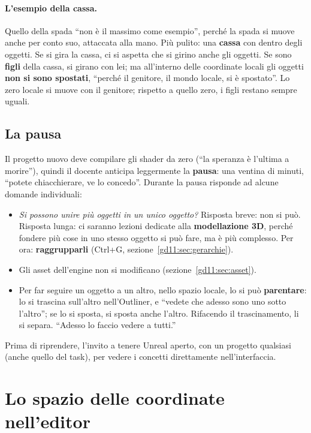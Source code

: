 \paragraph{L'esempio della cassa.} Quello della spada ``non è il massimo come
esempio'', perché la spada si muove anche per conto suo, attaccata alla mano. Più
pulito: una \textbf{cassa} con dentro degli oggetti. Se si gira la cassa, ci si
aspetta che si girino anche gli oggetti. Se sono \textbf{figli} della cassa,
si girano con lei; ma all'interno delle coordinate locali gli oggetti \textbf{non
si sono spostati}, ``perché il genitore, il mondo locale, si è spostato''. Lo
zero locale si muove con il genitore; rispetto a quello zero, i figli restano
sempre uguali.

\subsection{La pausa}

Il progetto nuovo deve compilare gli shader da zero (``la speranza è l'ultima a
morire''), quindi il docente anticipa leggermente la \textbf{pausa}: una ventina
di minuti, ``potete chiacchierare, ve lo concedo''. Durante la pausa risponde ad
alcune domande individuali:
\begin{itemize}
  \item \emph{Si possono unire più oggetti in un unico oggetto?} Risposta
        breve: non si può. Risposta lunga: ci saranno lezioni dedicate alla
        \textbf{modellazione 3D}, perché fondere più cose in uno stesso oggetto
        si può fare, ma è più complesso. Per ora: \textbf{raggrupparli}
        (Ctrl+G, sezione~\ref{gd11:sec:gerarchie}).
  \item Gli asset dell'engine non si modificano (sezione~\ref{gd11:sec:asset}).
  \item Per far seguire un oggetto a un altro, nello spazio locale, lo si può
        \textbf{parentare}: lo si trascina sull'altro nell'Outliner, e ``vedete
        che adesso sono uno sotto l'altro''; se lo si sposta, si sposta anche
        l'altro. Rifacendo il trascinamento, li si separa. ``Adesso lo faccio
        vedere a tutti.''
\end{itemize}
Prima di riprendere, l'invito a tenere Unreal aperto, con un progetto
qualsiasi (anche quello del task), per vedere i concetti direttamente
nell'interfaccia.

\section{Lo spazio delle coordinate nell'editor}
\label{gd11:sec:spazio}

